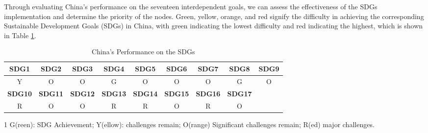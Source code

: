 \documentclass[12pt]{article}  %
\begin{document}
Through evaluating China's performance on the seventeen interdependent goals, we can assess the effectiveness of the SDGs implementation and determine the priority of the nodes.  
Green, yellow, orange, and red signify the difficulty in achieving the corresponding Sustainable Development Goals (SDGs) in China, with green indicating the lowest difficulty and red indicating the highest, which is shown in Table \ref{tab:6.1}.
\begin{center}
\begin{table}[!htbp]\vspace{-1.5em}\centering\caption{China's Performance on the SDGs}\label{tab:6.1}\begin{threeparttable}
\begin{tabular}{ccccccccc}
\toprule[1pt]
\textbf{SDG1} & \textbf{SDG2} & \textbf{SDG3} & \textbf{SDG4} & \textbf{SDG5} & \textbf{SDG6} & \textbf{SDG7} & \textbf{SDG8} & \textbf{SDG9} \\ 
\hline
\cellcolor{Yellow} Y & \cellcolor{BurntOrange} O &\cellcolor{BurntOrange} O &\cellcolor{LimeGreen} G & \cellcolor{BurntOrange} O & \cellcolor{BurntOrange} O &\cellcolor{BurntOrange} O &\cellcolor{LimeGreen}  G & \cellcolor{BurntOrange}O \\ \hline
\textbf{SDG10} & \textbf{SDG11} & \textbf{SDG12} & \textbf{SDG13} & \textbf{SDG14} & \textbf{SDG15} & \textbf{SDG16} & \textbf{SDG17} & \\ \hline
\cellcolor{Red} R & \cellcolor{BurntOrange} O & \cellcolor{BurntOrange} O &
\cellcolor{Red} R &
\cellcolor{Red} R & \cellcolor{BurntOrange} O &
\cellcolor{Red} R & \cellcolor{BurntOrange} O & \\ \hline
\end{tabular}

\end{threeparttable}\begin{tablenotes}
\footnotesize
\item[1] G(reen): SDG Achievement; Y(ellow): challenges remain; O(range) Significant challenges remain; R(ed) major challenges.
\end{tablenotes}\vspace{-1.5em}
\end{table}\end{center}
\end{document}

